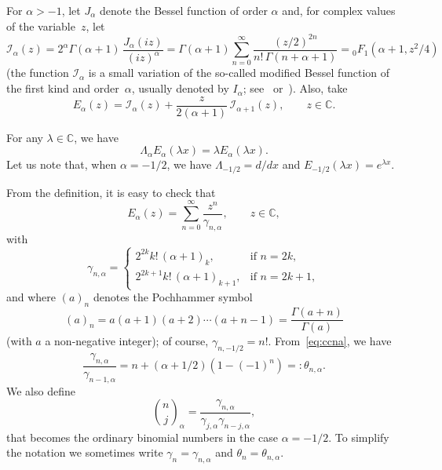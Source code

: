 \documentclass[11pt,a4paper]{article}
\theoremstyle{plain}
\theoremstyle{remark}
\newcommand{\I}{\mathcal{I}}
\newcommand{\Ea}{E_{\alpha}}
\newcommand{\La}{\Lambda_{\alpha}}
\newcommand{\binoma}[2]{\binom{#1}{#2}_{\!\alpha}}
\newcommand{\CC}{\mathbb{C}}
\newcommand{\cc}{\gamma}
\begin{document}
For $\alpha > -1$, let $J_\alpha$ denote the Bessel function of order $\alpha$ and,
for complex values of the variable~$z$, let
\[
  \I_\alpha(z)
  = 2^\alpha \Gamma(\alpha+1)\, \frac{J_\alpha(iz)}{(iz)^\alpha}
  = \Gamma(\alpha+1) \sum_{n=0}^\infty \frac{(z/2)^{2n}}{n!\,\Gamma(n+\alpha+1)}
  = {}_0F_1(\alpha+1,z^2/4)
\]
(the function $\I_\alpha$ is a small variation of the so-called modified Bessel function of the first kind and order~$\alpha$, usually denoted by $I_\alpha$; see~\cite{Wat} or~\cite{OlMa-NIST}).
Also, take %
\[
  \Ea(z) = \I_\alpha(z) + \frac{z}{2(\alpha+1)}\, \I_{\alpha+1}(z),
  \qquad z \in \CC.
\]

For any $\lambda \in \CC$, we have
\begin{equation*}
  \La \Ea(\lambda x) = \lambda \Ea(\lambda x).
\end{equation*}
Let us note that, when $\alpha = -1/2$, we have $\Lambda_{-1/2} = d/dx$ and $E_{-1/2}(\lambda x) = e^{\lambda x}$.

From the definition, it is easy to check that
\begin{equation}
\label{eq:serie-Ea}
  \Ea(z) = \sum_{n=0}^\infty \frac{z^n}{\cc_{n,\alpha}},
  \qquad z\in\CC,
\end{equation}
with 
\begin{equation}
\label{eq:ccna}
\cc_{n,\alpha} =
\begin{cases} 
  2^{2k}k!\,(\alpha+1)_k, & \text{if $n=2k$},\\
  2^{2k+1}k!\,(\alpha+1)_{k+1}, & \text{if $n=2k+1$},
\end{cases}
\end{equation}
and where $(a)_n$ denotes the Pochhammer symbol
\[
  (a)_n = a(a+1)(a+2) \cdots (a+n-1) = \frac{\Gamma(a+n)}{\Gamma(a)}
\]
(with $a$ a non-negative integer); of course, $\cc_{n,-1/2} = n!$.
From~\eqref{eq:ccna}, we have
\begin{equation*}
  \frac{\cc_{n,\alpha}}{\cc_{n-1,\alpha}} = n+(\alpha+1/2)(1-(-1)^n) =: \theta_{n,\alpha}.
\end{equation*}
We also define
\[
  \binoma{n}{j} = \frac{\cc_{n,\alpha}}{\cc_{j,\alpha}\cc_{n-j,\alpha}},
\]
that becomes the ordinary binomial numbers in the case $\alpha=-1/2$.
To simplify the notation we sometimes write $\cc_n=\cc_{n,\alpha}$ and $\theta_n=\theta_{n,\alpha}$.
\end{document}

